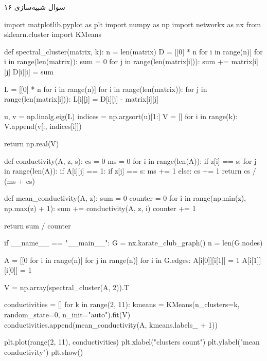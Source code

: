سوال شبیه‌سازی ۱۶

\begin{latin}
\begin{python}
import matplotlib.pyplot as plt
import numpy as np
import networkx as nx
from sklearn.cluster import KMeans

def spectral_cluster(matrix, k):
    n = len(matrix)
    D = [[0] * n for i in range(n)]
    for i in range(len(matrix)):
        sum = 0
        for j in range(len(matrix[i])):
            sum += matrix[i][j]
        D[i][i] = sum

    L = [[0] * n for i in range(n)]
    for i in range(len(matrix)):
        for j in range(len(matrix[i])):
            L[i][j] = D[i][j] - matrix[i][j]

    u, v = np.linalg.eig(L)
    indices = np.argsort(u)[1:]
    V = []
    for i in range(k):
        V.append(v[:, indices[i]])

    return np.real(V)

def conductivity(A, z, s):
    cs = 0
    ms = 0
    for i in range(len(A)):
        if z[i] == s:
            for j in range(len(A)):
                if A[i][j] == 1:
                    if z[j] == s:
                        ms += 1
                    else:
                        cs += 1
    return cs / (ms + cs)


def mean_conductivity(A, z):
    sum = 0
    counter = 0
    for i in range(np.min(z), np.max(z) + 1):
        sum += conductivity(A, z, i)
        counter += 1

    return sum / counter


if __name__ == "__main__":
    G = nx.karate_club_graph()
    n = len(G.nodes)

    A = [[0 for i in range(n)] for j in range(n)]
    for i in G.edges:
        A[i[0]][i[1]] = 1
        A[i[1]][i[0]] = 1

    V = np.array(spectral_cluster(A, 2)).T

    conductivities = []
    for k in range(2, 11):
        kmeans = KMeans(n_clusters=k, random_state=0, n_init="auto").fit(V)
        conductivities.append(mean_conductivity(A, kmeans.labels_ + 1))

    plt.plot(range(2, 11), conductivities)
    plt.xlabel("clusters count")
    plt.ylabel("mean conductivity")
    plt.show()
\end{python}
\end{latin}